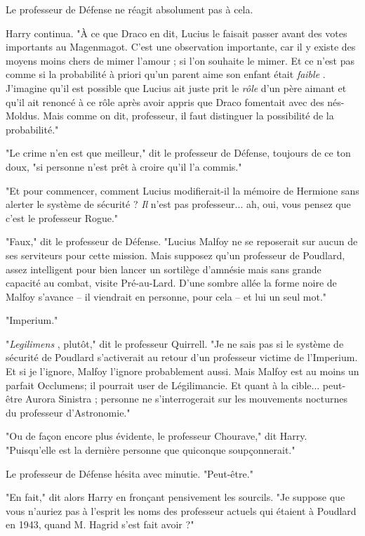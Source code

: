 Le professeur de Défense ne réagit absolument pas à cela.

Harry continua. "À ce que Draco en dit, Lucius le faisait passer avant des votes importants au Magenmagot. C'est une observation importante, car il y existe des moyens moins chers de mimer l'amour ; si l'on souhaite le mimer. Et ce n'est pas comme si la probabilité à priori qu'un parent aime son enfant était \emph{faible} . J'imagine qu'il est possible que Lucius ait juste prit le \emph{rôle}  d'un père aimant et qu'il ait renoncé à ce rôle après avoir appris que Draco fomentait avec des nés-Moldus. Mais comme on dit, professeur, il faut distinguer la possibilité de la probabilité."

"Le crime n'en est que meilleur," dit le professeur de Défense, toujours de ce ton doux, "si personne n'est prêt à croire qu'il l'a commis."

"Et pour commencer, comment Lucius modifierait-il la mémoire de Hermione sans alerter le système de sécurité ? \emph{Il}  n'est pas professeur... ah, oui, vous pensez que c'est le professeur Rogue."

"Faux," dit le professeur de Défense. "Lucius Malfoy ne se reposerait sur aucun de ses serviteurs pour cette mission. Mais supposez qu'un professeur de Poudlard, assez intelligent pour bien lancer un sortilège d'amnésie mais sans grande capacité au combat, visite Pré-au-Lard. D'une sombre allée la forme noire de Malfoy s'avance – il viendrait en personne, pour cela – et lui un seul mot."

"Imperium."

"\emph{Legilimens} , plutôt," dit le professeur Quirrell. "Je ne sais pas si le système de sécurité de Poudlard s'activerait au retour d'un professeur victime de l'Imperium. Et si je l'ignore, Malfoy l'ignore probablement aussi. Mais Malfoy est au moins un parfait Occlumens; il pourrait user de Légilimancie. Et quant à la cible... peut-être Aurora Sinistra ; personne ne s'interrogerait sur les mouvements nocturnes du professeur d'Astronomie."

"Ou de façon encore plus évidente, le professeur Chourave," dit Harry. "Puisqu'elle est la dernière personne que quiconque soupçonnerait."

Le professeur de Défense hésita avec minutie. "Peut-être."

"En fait," dit alors Harry en fronçant pensivement les sourcils. "Je suppose que vous n'auriez pas à l'esprit les noms des professeur actuels qui étaient à Poudlard en 1943, quand M. Hagrid s'est fait avoir ?"

